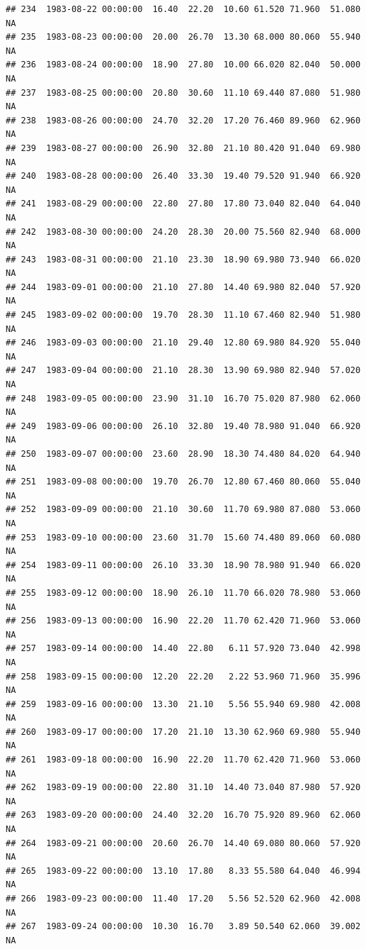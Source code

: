 \documentclass{article}\usepackage{graphicx, color}
\makeatletter
\newenvironment{kframe}{%
 \def\at@end@of@kframe{}%
 \ifinner\ifhmode%
  \def\at@end@of@kframe{\end{minipage}}%
  \begin{minipage}{\columnwidth}%
 \fi\fi%
 \def\FrameCommand##1{\hskip\@totalleftmargin \hskip-\fboxsep
 \colorbox{shadecolor}{##1}\hskip-\fboxsep
     \hskip-\linewidth \hskip-\@totalleftmargin \hskip\columnwidth}%
 \MakeFramed {\advance\hsize-\width
   \@totalleftmargin\z@ \linewidth\hsize
   \@setminipage}}%
 {\par\unskip\endMakeFramed%
 \at@end@of@kframe}
\newenvironment{knitrout}{}{} %
\makeatother
\begin{document}
\begin{knitrout}
\begin{kframe}
\begin{verbatim}
## 234  1983-08-22 00:00:00  16.40  22.20  10.60 61.520 71.960  51.080     NA
## 235  1983-08-23 00:00:00  20.00  26.70  13.30 68.000 80.060  55.940     NA
## 236  1983-08-24 00:00:00  18.90  27.80  10.00 66.020 82.040  50.000     NA
## 237  1983-08-25 00:00:00  20.80  30.60  11.10 69.440 87.080  51.980     NA
## 238  1983-08-26 00:00:00  24.70  32.20  17.20 76.460 89.960  62.960     NA
## 239  1983-08-27 00:00:00  26.90  32.80  21.10 80.420 91.040  69.980     NA
## 240  1983-08-28 00:00:00  26.40  33.30  19.40 79.520 91.940  66.920     NA
## 241  1983-08-29 00:00:00  22.80  27.80  17.80 73.040 82.040  64.040     NA
## 242  1983-08-30 00:00:00  24.20  28.30  20.00 75.560 82.940  68.000     NA
## 243  1983-08-31 00:00:00  21.10  23.30  18.90 69.980 73.940  66.020     NA
## 244  1983-09-01 00:00:00  21.10  27.80  14.40 69.980 82.040  57.920     NA
## 245  1983-09-02 00:00:00  19.70  28.30  11.10 67.460 82.940  51.980     NA
## 246  1983-09-03 00:00:00  21.10  29.40  12.80 69.980 84.920  55.040     NA
## 247  1983-09-04 00:00:00  21.10  28.30  13.90 69.980 82.940  57.020     NA
## 248  1983-09-05 00:00:00  23.90  31.10  16.70 75.020 87.980  62.060     NA
## 249  1983-09-06 00:00:00  26.10  32.80  19.40 78.980 91.040  66.920     NA
## 250  1983-09-07 00:00:00  23.60  28.90  18.30 74.480 84.020  64.940     NA
## 251  1983-09-08 00:00:00  19.70  26.70  12.80 67.460 80.060  55.040     NA
## 252  1983-09-09 00:00:00  21.10  30.60  11.70 69.980 87.080  53.060     NA
## 253  1983-09-10 00:00:00  23.60  31.70  15.60 74.480 89.060  60.080     NA
## 254  1983-09-11 00:00:00  26.10  33.30  18.90 78.980 91.940  66.020     NA
## 255  1983-09-12 00:00:00  18.90  26.10  11.70 66.020 78.980  53.060     NA
## 256  1983-09-13 00:00:00  16.90  22.20  11.70 62.420 71.960  53.060     NA
## 257  1983-09-14 00:00:00  14.40  22.80   6.11 57.920 73.040  42.998     NA
## 258  1983-09-15 00:00:00  12.20  22.20   2.22 53.960 71.960  35.996     NA
## 259  1983-09-16 00:00:00  13.30  21.10   5.56 55.940 69.980  42.008     NA
## 260  1983-09-17 00:00:00  17.20  21.10  13.30 62.960 69.980  55.940     NA
## 261  1983-09-18 00:00:00  16.90  22.20  11.70 62.420 71.960  53.060     NA
## 262  1983-09-19 00:00:00  22.80  31.10  14.40 73.040 87.980  57.920     NA
## 263  1983-09-20 00:00:00  24.40  32.20  16.70 75.920 89.960  62.060     NA
## 264  1983-09-21 00:00:00  20.60  26.70  14.40 69.080 80.060  57.920     NA
## 265  1983-09-22 00:00:00  13.10  17.80   8.33 55.580 64.040  46.994     NA
## 266  1983-09-23 00:00:00  11.40  17.20   5.56 52.520 62.960  42.008     NA
## 267  1983-09-24 00:00:00  10.30  16.70   3.89 50.540 62.060  39.002     NA

\end{verbatim}
\end{kframe}
\end{knitrout}
\end{document}
